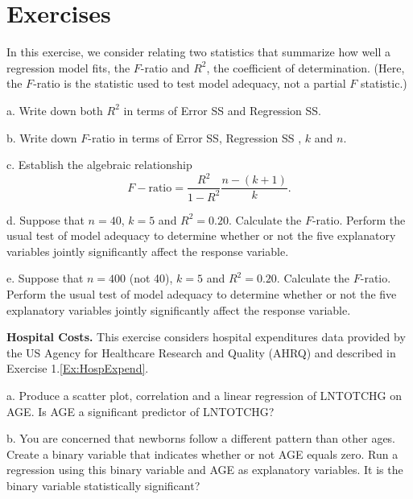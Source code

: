 \section{Exercises}


\begin{exercises}

\item In this exercise, we consider relating two statistics that summarize how well a regression model fits,
the $F$-ratio and $R^2$, the coefficient of determination. (Here,
the $F$-ratio is the statistic used to test model adequacy, not a
partial $F$ statistic.)

a.  Write down both $R^2$ in terms of Error SS and Regression SS.

b. Write down $F$-ratio in terms of Error SS, Regression SS , $k$
and $n$.

c. Establish the algebraic relationship
\begin{equation*}
F-\textrm{ratio} = \frac{R^2}{1-R^2} \frac{n-(k+1)}{k}.
\end{equation*}

d.  Suppose that $n = 40$, $k = 5$ and $R^2 = 0.20$. Calculate the
$F$-ratio. Perform the usual test of model adequacy to determine
whether or not the five explanatory variables jointly significantly
affect the response variable.

e.  Suppose that $n = 400$ (not 40), $k = 5$ and $R^2 = 0.20$.
Calculate the $F$-ratio. Perform the usual test of model adequacy to
determine whether or not the five explanatory variables jointly
significantly affect the response variable.


\item \textbf{Hospital Costs.}\label{Ex:HospExpend4} This exercise considers
hospital expenditures data provided by the US Agency for Healthcare
Research and Quality (AHRQ) and described in Exercise
1.\ref{Ex:HospExpend}.

a. Produce a scatter plot, correlation and a linear regression of
LNTOTCHG on AGE. Is AGE a significant predictor of LNTOTCHG?

b. You are concerned that newborns follow a different pattern than
other ages. Create a binary variable that indicates whether or not
AGE equals zero. Run a regression using this binary variable and AGE
as explanatory variables. It is the binary variable statistically
significant?


\end{exercises}

